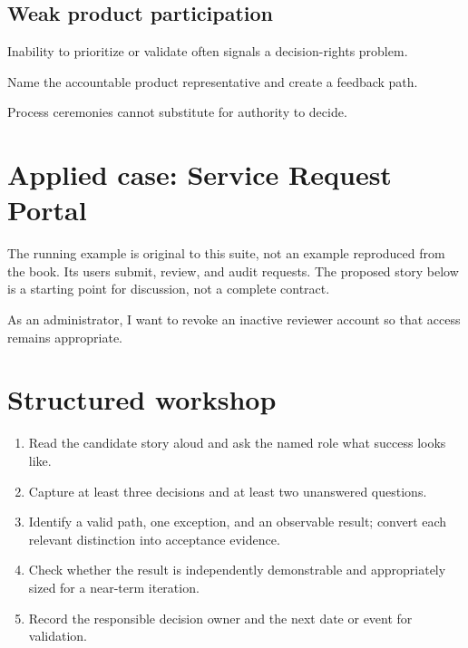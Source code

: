\documentclass[11pt,letterpaper]{article}
\begin{document}
\subsection{Weak product participation}
Inability to prioritize or validate often signals a decision-rights problem.

\begin{tcolorbox}[colback=tealback,colframe=navy,title={Engineering translation},breakable]
Name the accountable product representative and create a feedback path.

\end{tcolorbox}
\begin{tcolorbox}[colback=amberback,colframe=navy,title={Failure mode to watch},breakable]
Process ceremonies cannot substitute for authority to decide.

\end{tcolorbox}
\section{Applied case: Service Request Portal}
The running example is original to this suite, not an example reproduced from the book. Its users submit, review, and audit requests. The proposed story below is a starting point for discussion, not a complete contract.

\begin{tcolorbox}[colback=blueback,colframe=navy,title={Candidate story},breakable]
As an administrator, I want to revoke an inactive reviewer account so that access remains appropriate.

\end{tcolorbox}
\section{Structured workshop}
\begin{enumerate}[leftmargin=*,itemsep=3pt]
\item Read the candidate story aloud and ask the named role what success looks like.
\item Capture at least three decisions and at least two unanswered questions.
\item Identify a valid path, one exception, and an observable result; convert each relevant distinction into acceptance evidence.
\item Check whether the result is independently demonstrable and appropriately sized for a near-term iteration.
\item Record the responsible decision owner and the next date or event for validation.
\end{enumerate}
\end{document}
